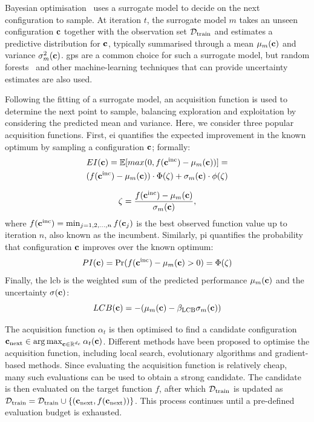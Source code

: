 Bayesian optimisation~\citep{Garnett23} uses a surrogate model to decide on the next configuration to sample. At iteration $t$, the surrogate model $m$ takes an unseen configuration $\mathbf{c}$ together with the observation set $\mathcal{D}_{\text{train}}$ and estimates a predictive distribution for $\mathbf{c}$, typically summarised through a mean $\mu_m(\mathbf{c})$ and variance $\sigma_m^2(\mathbf{c})$.
\glspl{gp} are a common choice for such a surrogate model, but random forests~\citep{HutEtAl11} and other machine-learning techniques that can provide uncertainty estimates are also used.

Following the fitting of a surrogate model, an acquisition function is used to determine the next point to sample, balancing exploration and exploitation by considering the predicted mean and variance. Here, we consider three popular acquisition functions. First, \gls{ei} quantifies the expected improvement in the known optimum by sampling a configuration $\mathbf{c}$; formally:
\begin{multline}
    EI(\mathbf{c})=\mathbb{E}[max(0, f(\mathbf{c}^{\mathrm{inc}})-\mu_m(\mathbf{c}))]=\\(f(\mathbf{c}^{\mathrm{inc}})-\mu_m(\mathbf{c}))\cdot\Phi(\zeta)+\sigma_m(\mathbf{c})\cdot\phi(\zeta)
\end{multline}

\begin{equation*}
    \zeta=\frac{f(\mathbf{c}^{\mathrm{inc}})-\mu_m(\mathbf{c})}{\sigma_m(\mathbf{c})},
\end{equation*}
where $f(\mathbf{c}^{\mathrm{inc}})=\min_{j=1, 2, ..., n} f(\mathbf{c} _j)$ is the best observed function value up to iteration $n$, also known as the incumbent.
Similarly, \gls{pi} quantifies the probability that configuration $\mathbf{c}$ improves over the known optimum:
\begin{equation*}
    PI(\mathbf{c})=\Pr(f(\mathbf{c}^{\mathrm{inc}})-\mu_m(\mathbf{c}) > 0)=\Phi(\zeta)
\end{equation*}
Finally, the \gls{lcb} is the weighted sum of the predicted performance $\mu_m(\mathbf{c})$ and the uncertainty $\sigma(\mathbf{c})$:
\begin{equation*}
    LCB(\mathbf{c})=-(\mu_m(\mathbf{c})-\beta_{\mathrm{LCB}}\sigma_m(\mathbf{c}))
\end{equation*}

The acquisition function $\alpha_t$ is then optimised to find a candidate configuration $\mathbf{c}_{\mathrm{next}} \in \operatorname*{arg\,max}_{\mathbf{c}\in\mathbb{R}^{d_c}}\alpha_t(\mathbf{c})$. Different methods have been proposed to optimise the acquisition function, including local search, evolutionary algorithms and gradient-based methods. Since evaluating the acquisition function is relatively cheap, many such evaluations can be used to obtain a strong candidate. The candidate is then evaluated on the target function $f$, after which $\mathcal{D}_{\text{train}}$ is updated as $\mathcal{D}_{\text{train}}=\mathcal{D}_{\text{train}} \cup \{(\mathbf{c}_{\mathrm{next}}, f(\mathbf{c}_{\mathrm{next}}))\}$. This process continues until a pre-defined evaluation budget is exhausted.
